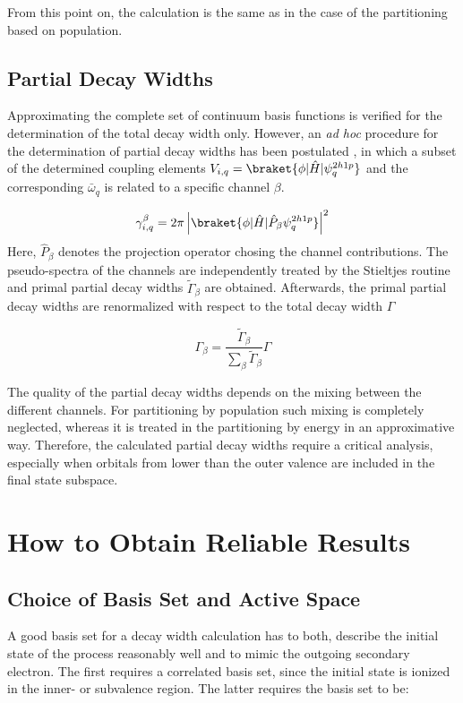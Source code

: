 From this point on, the calculation is the same as in the case of the partitioning
based on population.

\subsection{Partial Decay Widths} \label{section:partial}
Approximating the complete set of continuum basis functions is verified for
the determination of the total decay width only. However, an \emph{ad hoc} procedure
for the determination of partial decay widths has been postulated \cite{Cacelli86},
in which a subset of the determined coupling elements
$V_{i,q} = \braket{\phi |\hat{H}| \psi_{q}^{2h1p}}$  and the corresponding
$\bar{\omega}_q$ is related to a specific channel $\beta$.

\begin{equation}
 \gamma_{i,q}^{\beta} = 2\pi \left| \braket{\phi| \hat{H} | \hat{P}_\beta \psi_{q}^{2h1p}} 
                    \right|^2
\end{equation}
Here, $\hat{P}_\beta$ denotes the projection operator chosing the channel contributions.
The pseudo-spectra of the channels are independently treated by the Stieltjes
routine and primal partial decay widths $\tilde{\Gamma}_\beta$ are obtained.
Afterwards, the primal partial decay widths
are renormalized with respect to the total decay width $\Gamma$

\begin{equation}
 \Gamma_\beta = \frac{\tilde{\Gamma}_\beta}{\sum_\beta \tilde{\Gamma}_\beta} \Gamma
\end{equation}

The quality of the partial decay widths depends on the mixing between the different
channels. For partitioning by population such mixing is completely neglected, whereas
it is treated in the partitioning by energy in an approximative way. Therefore,
the calculated partial decay widths require a critical analysis, especially when
orbitals from lower than the outer valence are included in the final state subspace.




\section{How to Obtain Reliable Results}
\subsection{Choice of Basis Set and Active Space}
A good basis set for a decay width calculation has to both,
describe the initial state of the process reasonably well and to mimic
the outgoing secondary electron. The first requires a correlated basis set, since
the initial state is ionized in the inner- or subvalence region.
The latter requires the basis set to be:


